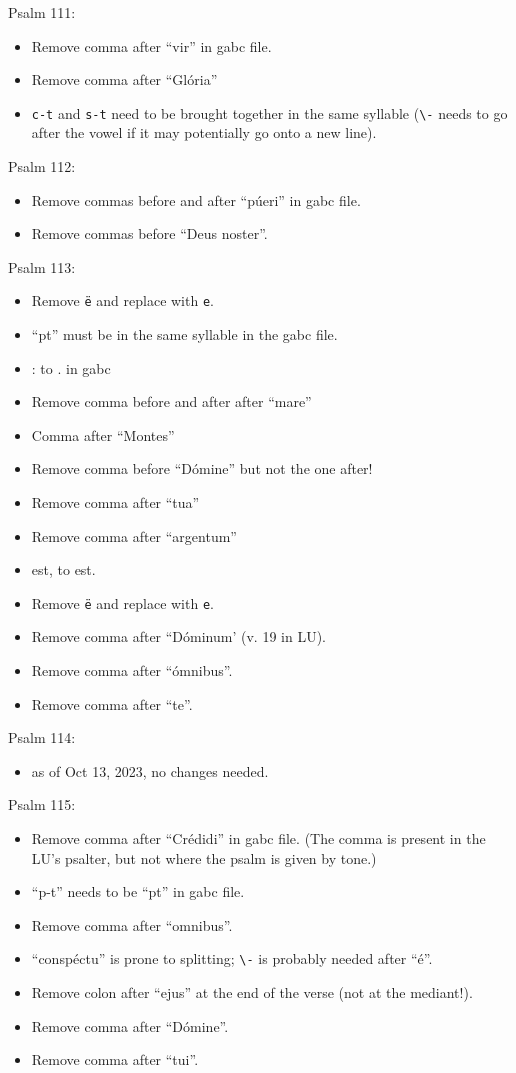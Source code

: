 \documentclass[11pt]{article}
\begin{document}
 Psalm 111:
\begin{itemize}
\item
Remove comma after ``vir'' in gabc file.
\item Remove comma after ``Glória''
\item \texttt{c-t} and \texttt{s-t} need to be brought together in the same syllable (\verb|\-| needs to go after the vowel if it may potentially go onto a new line).
\end{itemize}

 Psalm 112:
  \begin{itemize}
\item Remove commas before and after ``púeri'' in gabc file.
\item Remove commas before ``Deus noster''.
 \end{itemize}
 
 Psalm 113:
  \begin{itemize}
   \item Remove \texttt{ë} and replace with \texttt{e}.
    \item ``pt'' must be in the same syllable in the gabc file.
    \item
    : to . in gabc
       \item  Remove comma before and after after ``mare''
       \item
       Comma after ``Montes''
  \item Remove comma before ``Dómine'' but not the one after!
    \item
  Remove comma after ``tua''
  \item
  Remove comma after ``argentum''
  \item
  est, to est.
\item Remove \texttt{ë} and replace with \texttt{e}.
\item Remove comma after ``Dóminum' (v. 19 in LU).
   \item
 Remove comma after ``ómnibus''.
   \item
 Remove comma after ``te''.
 \end{itemize}
 
  Psalm 114:
  \begin{itemize}
  \item as of Oct 13, 2023, no changes needed.
    \end{itemize}
 
 Psalm 115:
 \begin{itemize}
 \item Remove comma after ``Crédidi'' in gabc file. (The comma is present in the LU's psalter, but not where the psalm is given by tone.)
 \item
 ``p-t'' needs to be ``pt'' in gabc file.
    \item  Remove comma after ``omnibus''.
 \item
 ``conspéctu'' is prone to splitting; \verb|\-| is probably needed after ``é''.
   \item
 Remove colon after ``ejus'' at the end of the verse (not at the mediant!).
  \item
 Remove comma after ``Dómine''.
 \item
 Remove comma after ``tui''.
 \end{itemize}
 
\end{document}
